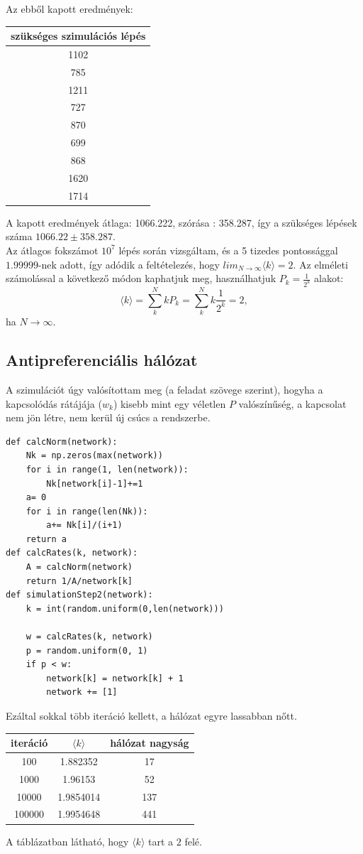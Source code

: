 \documentclass[12pt]{article}
\begin{document}
 Az ebből kapott eredmények:
 \begin{center}
\begin{tabular}{|c|}\hline
szükséges szimulációs lépés\\ \hline
1102 \\ \hline
785 \\ \hline
1211 \\ \hline
727 \\ \hline
870\\ \hline
699 \\ \hline
868 \\ \hline
1620 \\ \hline
1714\\ \hline
\end{tabular}
\end{center} 
A kapott eredmények átlaga: 1066.222, szórása : 358.287, így a szükséges lépések száma $1066.22\pm 358.287$. \\
Az átlagos fokszámot $10^7$ lépés során vizsgáltam, és a 5 tizedes pontossággal $1.99999$-nek adott, így adódik a feltételezés, hogy $lim_{N\to\infty}\langle k\rangle = 2$. Az elméleti számolással a következő módon kaphatjuk meg, használhatjuk $P_k = \frac{1}{2^k}$ alakot:
$$\langle k\rangle = \sum^N_kkP_k = \sum^N_k k\frac{1}{2^k} = 2,$$
ha $N\to \infty$.
\newpage
\subsection*{Antipreferenciális hálózat}
A szimulációt úgy valósítottam meg (a feladat szövege szerint), hogyha a kapcsolódás rátájája ($w_k$) kisebb mint egy véletlen $P$ valószínűség, a kapcsolat nem jön létre, nem kerül új csúcs a rendszerbe.
\begin{lstlisting}
def calcNorm(network):
    Nk = np.zeros(max(network))
    for i in range(1, len(network)):
        Nk[network[i]-1]+=1
    a= 0
    for i in range(len(Nk)):
        a+= Nk[i]/(i+1)
    return a    
def calcRates(k, network):
    A = calcNorm(network)
    return 1/A/network[k]
def simulationStep2(network):
    k = int(random.uniform(0,len(network)))
    
    w = calcRates(k, network)
    p = random.uniform(0, 1)
    if p < w:
        network[k] = network[k] + 1
        network += [1]
\end{lstlisting}
Ezáltal sokkal több iteráció kellett, a hálózat egyre lassabban nőtt.
\begin{center}
\begin{tabular}{|c|c|c|}\hline
iteráció&$\langle k\rangle$ & hálózat nagyság \\ \hline
100&1.882352 & 17\\ \hline
1000&1.96153 & 52\\ \hline
10000&1.9854014 &137\\ \hline
100000&1.9954648& 441 \\ \hline
\end{tabular}
\end{center}
A táblázatban látható, hogy $\langle k\rangle$ tart a $2$ felé.
\end{document}
